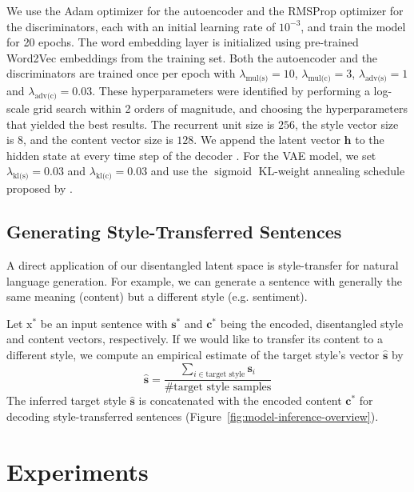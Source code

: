 \documentclass[letterpaper]{article} %
\newcommand{\rmx}{\mathrm x}
\newcommand{\hyp}[1]{\lambda_{\text{#1}}}
\newcommand{\citeay}[1]{\citeauthor{#1} \shortcite{#1}}
\begin{document}
We use the Adam optimizer \cite{kingma2014adam} for the autoencoder and the RMSProp optimizer \cite{tieleman2012lecture} for the discriminators, each with an initial learning rate of $10^{-3}$, and train the model for 20 epochs.
The word embedding layer is initialized using pre-trained Word2Vec embeddings \cite{mikolov2013distributed} from the training set.
Both the autoencoder and the discriminators are trained once per epoch with $\hyp{mul(s)} = 10$, $\hyp{mul(c)} = 3$, $\hyp{adv(s)} = 1$ and $\hyp{adv(c)} = 0.03$.
These hyperparameters were identified by performing a log-scale grid search within 2 orders of magnitude, and choosing the hyperparameters that yielded the best results.
The recurrent unit size is $256$, the style vector size is $8$, and the content vector size is $128$.
We append the latent vector $\bm h$ to the hidden state at every time step of the decoder \cite{bahuleyan2017variational}.
For the VAE model, we set $\hyp{kl(s)} = 0.03$ and $\hyp{kl(c)} = 0.03$ and use the $\operatorname{sigmoid}$ KL-weight annealing schedule proposed by \citeay{bahuleyan2018probabilistic}.


\subsection{Generating Style-Transferred Sentences} \label{ssec:sentence-generation}

A direct application of our disentangled latent space is style-transfer for natural language generation.
For example, we can generate a sentence with generally the same meaning (content) but a different style (e.g. sentiment).

Let $\rmx^*$ be an input sentence with $\bm s^*$ and $\bm c^*$ being the encoded, disentangled style and content vectors, respectively.
If we would like to transfer its content to a different style, we compute an empirical estimate of the target style's vector $\hat{\bm s}$ by
\begin{equation*}
	\hat{\bm s}=\frac{\sum_{i\in\text{target style}}\bm s_i}{\text{\# target style samples}}
\end{equation*}
The inferred target style $\hat{\bm s}$ is concatenated with the encoded content $\bm c^*$ for decoding style-transferred sentences (Figure~\ref{fig:model-inference-overview}).


\section{Experiments}
\end{document}
